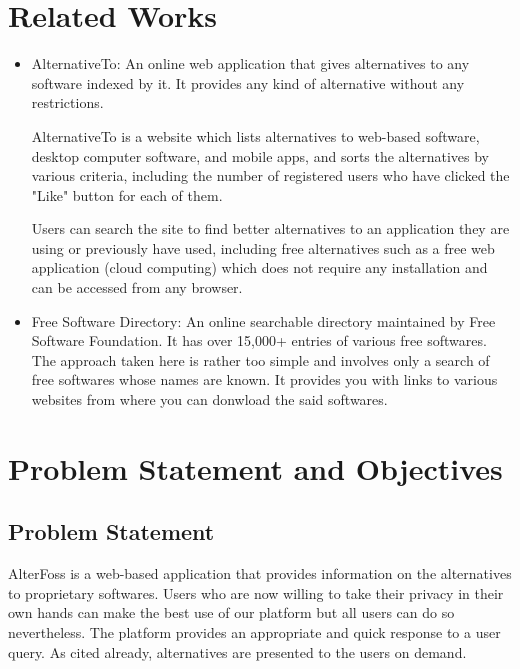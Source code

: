 \section{Related Works}
\begin{itemize}
    \item AlternativeTo\cite{Alternative}: An online web application that gives alternatives to any software indexed by it. It provides any kind of alternative without any restrictions.

          AlternativeTo  is a website which lists alternatives to web-based software, desktop computer software, and mobile apps, and sorts the alternatives by various criteria, including the number of registered users who have clicked the "Like" button for each of them.

          Users can search the site to find better alternatives to an application they are using or previously have used, including free alternatives such as a free web application (cloud computing) which does not require any installation and can be accessed from any browser.

    \item Free Software Directory\cite{FSF}: An online searchable directory maintained by Free Software Foundation. It has over 15,000+ entries of various free softwares. The approach taken here is rather too simple and involves only a search of free softwares whose names are known. It provides you with links to various websites from where you can donwload the said softwares.

\end{itemize}


\section{Problem Statement and Objectives}

\subsection{Problem Statement}
AlterFoss is a web-based application that provides information on the alternatives to proprietary softwares. Users who are now willing to take their privacy in their own hands can make the best use of our platform but all users can do so nevertheless. The platform provides an appropriate and quick response to a user query. As cited already, alternatives are presented to the users on demand.


